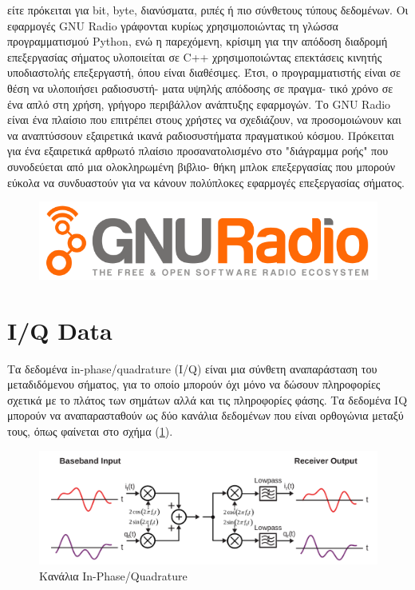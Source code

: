 \documentclass[12pt]{report}
\begin{document}
            είτε πρόκειται για bit, byte, διανύσματα, ριπές ή πιο σύνθετους τύπους δεδομένων. Οι
            εφαρμογές GNU Radio γράφονται κυρίως χρησιμοποιώντας τη γλώσσα προγραμματισμού Python,
            ενώ η παρεχόμενη, κρίσιμη για την απόδοση διαδρομή επεξεργασίας σήματος υλοποιείται σε
            C++ χρησιμοποιώντας επεκτάσεις κινητής υποδιαστολής επεξεργαστή, όπου είναι διαθέσιμες.
            Έτσι, ο προγραμματιστής είναι σε θέση να υλοποιήσει ραδιοσυστή- ματα υψηλής απόδοσης σε
            πραγμα- τικό χρόνο σε ένα απλό στη χρήση, γρήγορο περιβάλλον ανάπτυξης εφαρμογών. Το GNU
            Radio είναι ένα πλαίσιο που επιτρέπει στους χρήστες να σχεδιάζουν, να προσομοιώνουν και
            να αναπτύσσουν εξαιρετικά ικανά ραδιοσυστήματα πραγματικού κόσμου. Πρόκειται για ένα
            εξαιρετικά αρθρωτό πλαίσιο προσανατολισμένο στο "διάγραμμα ροής" που συνοδεύεται από μια
            ολοκληρωμένη βιβλιο- θήκη μπλοκ επεξεργασίας που μπορούν εύκολα να συνδυαστούν για να
            κάνουν πολύπλοκες εφαρμογές επεξεργασίας σήματος.

            \begin{figure}[h]
                \centering
                \includegraphics[width=.9\textwidth]{gnuradio.png}
            \end{figure}
        
    \section{\textsf{I/Q Data}}
        Τα δεδομένα in-phase/quadrature (I/Q) είναι μια σύνθετη αναπαράσταση του μεταδιδόμενου
        σήματος, για το οποίο μπορούν όχι μόνο να δώσουν πληροφορίες σχετικά με το πλάτος των 
        σημάτων αλλά και τις πληροφορίες φάσης. Τα δεδομένα IQ μπορούν να αναπαρασταθούν ως δύο
        κανάλια δεδομένων που είναι ορθογώνια μεταξύ τους, όπως φαίνεται στο σχήμα (\ref{fig:I/Q}).

        \begin{figure}[h]
            \centering
            \includegraphics[width=.8\textwidth]{iq_diagram.png}
            \caption{Κανάλια In-Phase/Quadrature}
            \label{fig:I/Q}
        \end{figure}
\end{document}
